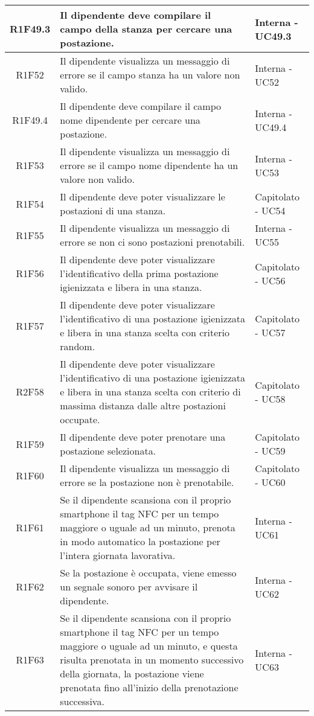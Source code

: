 \begin{center}
\begin{longtable}{|c|p{10cm}|p{4cm}|}
		\hline
			R1F49.3&Il dipendente deve compilare il campo della stanza per cercare una postazione.		&Interna - UC49.3	\\
		\hline
			R1F52&Il dipendente visualizza un messaggio di errore se il campo stanza ha un valore non valido.	&Interna - UC52	\\
		\hline
			R1F49.4&Il dipendente deve compilare il campo nome dipendente per cercare una postazione.	&Interna - UC49.4	\\
		\hline
			R1F53&Il dipendente visualizza un messaggio di errore se il campo nome dipendente ha un valore non valido.	&Interna - UC53	\\
		\hline
		R1F54&Il dipendente deve poter visualizzare le postazioni di una stanza.	&Capitolato - UC54	\\
		\hline
			R1F55&Il dipendente visualizza un messaggio di errore se non ci sono postazioni prenotabili.	&Interna - UC55	\\
		\hline
		R1F56&Il dipendente deve poter visualizzare l'identificativo della prima postazione igienizzata e libera in una stanza.	&Capitolato - UC56	\\
		\hline
		R1F57&Il dipendente deve poter visualizzare l'identificativo di una postazione igienizzata e libera in una stanza scelta con criterio random.	&Capitolato - UC57	\\
		\hline
		R2F58&Il dipendente deve poter visualizzare l'identificativo di una postazione igienizzata e libera in una stanza scelta con criterio di massima distanza dalle altre postazioni occupate.	&Capitolato - UC58	\\
		\hline
		R1F59&Il dipendente deve poter prenotare una postazione selezionata.	&Capitolato - UC59	\\
		\hline
		R1F60&Il dipendente visualizza un messaggio di errore se la postazione non è prenotabile.	&Capitolato - UC60	\\
		\hline
		R1F61&Se il dipendente scansiona con il proprio smartphone il tag NFC per un tempo maggiore o uguale ad un minuto, prenota in modo automatico la postazione per l’intera giornata lavorativa. &Interna - UC61	\\
		\hline
		R1F62&Se la postazione è occupata, viene emesso un segnale sonoro per avvisare il dipendente.	& Interna - UC62	\\
		\hline
		R1F63&Se il dipendente scansiona con il proprio smartphone il tag NFC per un tempo maggiore o uguale ad un minuto, e questa risulta prenotata in un momento successivo della giornata, la postazione viene prenotata fino all'inizio della prenotazione successiva.	&Interna - UC63	\\

\end{longtable}
\end{center}
